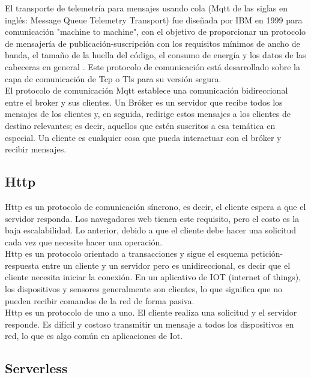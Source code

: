El transporte de telemetría para mensajes usando cola (Mqtt de las siglas en inglés: Message Queue Telemetry Transport) fue diseñada por IBM en 1999 para comunicación "machine to machine", con el objetivo de proporcionar un protocolo de mensajería de publicación-suscripción con los requisitos mínimos de ancho de banda, el tamaño de la huella del código, el consumo de energía y los datos de las cabeceras en general \cite{Babovic2016}. Este protocolo de comunicación está desarrollado sobre la capa de comunicación de Tcp o Tls para su versión segura. 
\vspace{0.5cm}\\
El protocolo de comunicación Mqtt establece una comunicación bidireccional entre el broker y sus clientes. Un Bróker es un servidor que recibe todos los mensajes de los clientes y, en seguida, redirige estos mensajes a los clientes de destino relevantes; es decir, aquellos que estén suscritos a esa temática en especial. Un cliente es cualquier cosa que pueda interactuar con el bróker y recibir mensajes.

\subsection{Http}

Http es un protocolo de comunicación síncrono, es decir, el cliente espera a que el servidor responda. Los navegadores web tienen este requisito, pero el costo es la baja escalabilidad. Lo anterior, debido a que el cliente debe hacer una solicitud cada vez que necesite hacer una operación. 
\vspace{0.5cm}\\
Http es un protocolo orientado a transacciones y sigue el esquema petición-respuesta entre un cliente y un servidor pero es unidireccional, es decir que el cliente necesita iniciar la conexión. En un aplicativo de IOT (internet of things), los dispositivos y sensores generalmente son clientes, lo que significa que no pueden recibir comandos de la red de forma pasiva.
\vspace{0.5cm}\\
Http es un protocolo de uno a uno. El cliente realiza una solicitud y el servidor responde. Es difícil y costoso transmitir un mensaje a todos los dispositivos en red, lo que es algo común en aplicaciones de Iot.

\subsection{Serverless}


